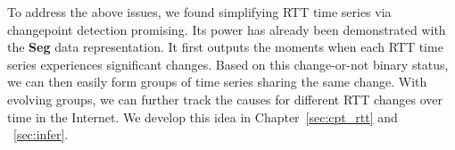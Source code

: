 To address the above issues, we found simplifying RTT time series via changepoint detection promising. 
Its power has already been demonstrated with the \textbf{Seg} data representation.
It first outputs the moments when each RTT time series experiences significant changes. 
Based on this change-or-not binary status, we can then easily form groups of time series sharing the same change. 
With evolving groups, we can further track the causes for different RTT changes over time in the Internet.
We develop this idea in Chapter~\ref{sec:cpt_rtt} and ~\ref{sec:infer}.
